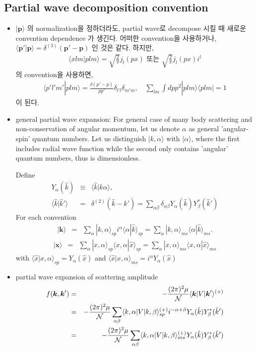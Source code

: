 \documentclass[10pt]{book}
\def\bm{\boldsymbol}
\newcommand{\bea}{\begin{eqnarray}}
\newcommand{\eea}{\end{eqnarray}}
\newcommand{\no}{\nonumber \\}
\def\vp{{\bm p}}
\def\vk{{\bm k}}
\def\vx{{\bm x}}
\def\la{\langle}
\def\ra{\rangle}
\begin{document}
\subsection{Partial wave decomposition convention }
\begin{itemize}
\item
$|\vp\ra$ 의 normalization을 정하더라도, partial wave로 decompose
시킬 때 새로운 convention dependence 가 생긴다. 
어떠한 convention을 사용하거나, 
$\la \vp'|\vp\ra=\delta^{(3)}(\vp'-\vp)$ 인 것은 같다. 하지만, 
\bea
\la x lm| p lm\ra=\sqrt{\frac{2}{\pi}}j_l(px)\mbox{ 또는 } 
    \sqrt{\frac{2}{\pi}}j_l(px) i^l
\eea
의 convention을 사용하면,
\bea
\la p' l' m'|p lm\ra=\frac{\delta(p'-p)}{pp'}\delta_{l'l}\delta_{m'm},
\quad
\sum_{lm}\int dp p^2|p lm\ra\la p lm|=1
\eea
이 된다.

\item general partial wave expansion: 
For general case of many body scattering and 
non-conservation of angular momentum, let us
denote $\alpha$ as general
'angular-spin' quantum numbers. 
Let us distinguish
$|k,\alpha\ra$ with $|\alpha\ra$, where the first includes
radial wave function while the second only contains 
'angular' quantum numbers, thus is dimensionless. 

Define
\bea
Y_{\alpha}(\hat{k})&\equiv&\la \hat{k}|k \alpha\ra,\no
\la \hat{k}|\hat{k}'\ra&=&\delta^{(2)}(\hat{k}-\hat{k}')
 =\sum_{\alpha\beta}\delta_{\alpha\beta} 
  Y_{\alpha}(\hat{k})Y_{\beta}^*(\hat{k}')
\eea
For each convention
\bea
|\vk\ra&=&
\sum_\alpha |k, \alpha\ra_{sp}  
                i^\alpha \la \alpha|\hat{k}\ra_{sp}
                =
\sum_\alpha |k, \alpha\ra_{ms}  
            \la \alpha|\hat{k}\ra_{ms}.
\eea
\bea
|\vx\ra&=&\sum_{\alpha} |x,\alpha\ra_{sp} 
           \la x,\alpha|\hat{x}\ra_{sp}
       =\sum_{\alpha} |x,\alpha\ra_{ms} 
           \la x,\alpha|\hat{x}\ra_{ms}
\eea
with $\la \hat{x}|x,\alpha \ra_{sp}=Y_{\alpha}(\hat{x})$
and $\la \hat{x}|x,\alpha \ra_{ms}=i^\alpha Y_{\alpha}(\hat{x})$

\item partial wave expansion of scattering amplitude
\bea
f(\vk,\vk')&=&-\frac{(2\pi)^2\mu}{\cal N} \la \vk|V|\vk'\ra^{(+)}\no
           &=&-\frac{(2\pi)^2\mu}{\cal N} \sum_{\alpha\beta} 
        \la k,\alpha|V| k,\beta\ra^{(+)}_{sp}
        i^{-\alpha+\beta}
        Y_{\alpha}(\hat{k})Y_{\beta}^*(\hat{k}') \no
        &=&-\frac{(2\pi)^2\mu}{\cal N} \sum_{\alpha\beta} 
        \la k,\alpha|V| k,\beta\ra^{(+)}_{ms}
        Y_{\alpha}(\hat{k})Y_{\beta}^*(\hat{k}')  
\eea


\end{itemize}
\end{document}
